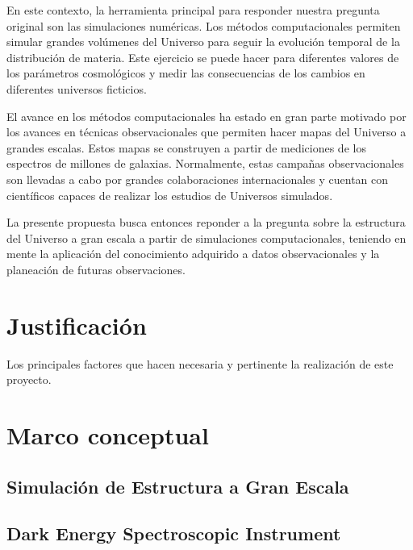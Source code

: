 \documentclass[12pt]{article}
\begin{document}
En este contexto, la herramienta principal para responder nuestra
pregunta original son las simulaciones num\'ericas. Los 
m\'etodos computacionales permiten simular grandes
vol\'umenes del Universo para seguir la evoluci\'on temporal de la
distribuci\'on de materia. Este ejercicio se puede hacer para
diferentes valores de los par\'ametros cosmol\'ogicos y 
medir las consecuencias de los cambios en diferentes universos
ficticios.  

El avance en los m\'etodos computacionales ha estado en gran parte
motivado por los avances en t\'ecnicas observacionales que permiten
hacer mapas del Universo a grandes escalas. Estos mapas se construyen
a partir de mediciones de los espectros de millones de
galaxias. Normalmente, estas campa\~nas observacionales son llevadas a
cabo por grandes colaboraciones internacionales y cuentan  con
cient\'ificos capaces de realizar los estudios de Universos simulados.

La presente propuesta busca entonces reponder a la pregunta sobre la
estructura del Universo a gran escala a partir de simulaciones
computacionales, teniendo en mente la aplicaci\'on del conocimiento
adquirido a datos observacionales y la planeaci\'on de futuras
observaciones.

\section{Justificaci\'on}

Los principales factores que hacen necesaria y pertinente la
realizaci\'on de este proyecto.

\section{Marco conceptual}


\subsection*{Simulaci\'on de Estructura a Gran Escala}

\subsection*{Dark Energy Spectroscopic Instrument}
\end{document}

